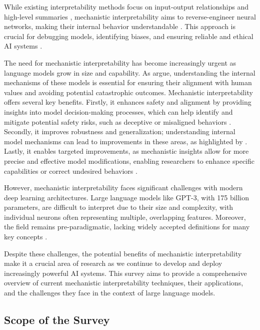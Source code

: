 \documentclass[sigconf,authoryear]{acmart}
\begin{document}
While existing interpretability methods focus on input-output relationships and high-level summaries \citep{zhao2023explainabilitylargelanguagemodels, bolukbasi2021interpretabilityillusionbert}, mechanistic interpretability aims to reverse-engineer neural networks, making their internal behavior understandable \citep{olah2020zoom}. This approach is crucial for debugging models, identifying biases, and ensuring reliable and ethical AI systems \citep{räuker2023transparentaisurveyinterpreting}.

The need for mechanistic interpretability has become increasingly urgent as language models grow in size and capability. As \citet{bereska_mechanistic_2024} argue, understanding the internal mechanisms of these models is essential for ensuring their alignment with human values and avoiding potential catastrophic outcomes. Mechanistic interpretability offers several key benefits. Firstly, it enhances safety and alignment by providing insights into model decision-making processes, which can help identify and mitigate potential safety risks, such as deceptive or misaligned behaviors \citep{bereska_mechanistic_2024}. Secondly, it improves robustness and generalization; understanding internal model mechanisms can lead to improvements in these areas, as highlighted by \citet{rai2024practicalreviewmechanisticinterpretability}. Lastly, it enables targeted improvements, as mechanistic insights allow for more precise and effective model modifications, enabling researchers to enhance specific capabilities or correct undesired behaviors \citep{rai2024practicalreviewmechanisticinterpretability}.

However, mechanistic interpretability faces significant challenges with modern deep learning architectures. Large language models like GPT-3, with 175 billion parameters, are difficult to interpret due to their size and complexity, with individual neurons often representing multiple, overlapping features. Moreover, the field remains pre-paradigmatic, lacking widely accepted definitions for many key concepts \citep{bereska_mechanistic_2024}.

Despite these challenges, the potential benefits of mechanistic interpretability make it a crucial area of research as we continue to develop and deploy increasingly powerful AI systems. This survey aims to provide a comprehensive overview of current mechanistic interpretability techniques, their applications, and the challenges they face in the context of large language models.

\subsection{Scope of the Survey}
\end{document}

